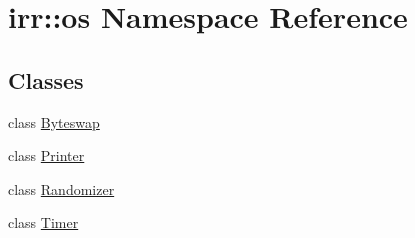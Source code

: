 \hypertarget{namespaceirr_1_1os}{\section{irr\-:\-:os Namespace Reference}
\label{namespaceirr_1_1os}
}
\subsection*{Classes}
\begin{DoxyCompactItemize}
\item 
class \hyperlink{classirr_1_1os_1_1_byteswap}{Byteswap}
\item 
class \hyperlink{classirr_1_1os_1_1_printer}{Printer}
\item 
class \hyperlink{classirr_1_1os_1_1_randomizer}{Randomizer}
\item 
class \hyperlink{classirr_1_1os_1_1_timer}{Timer}
\end{DoxyCompactItemize}
